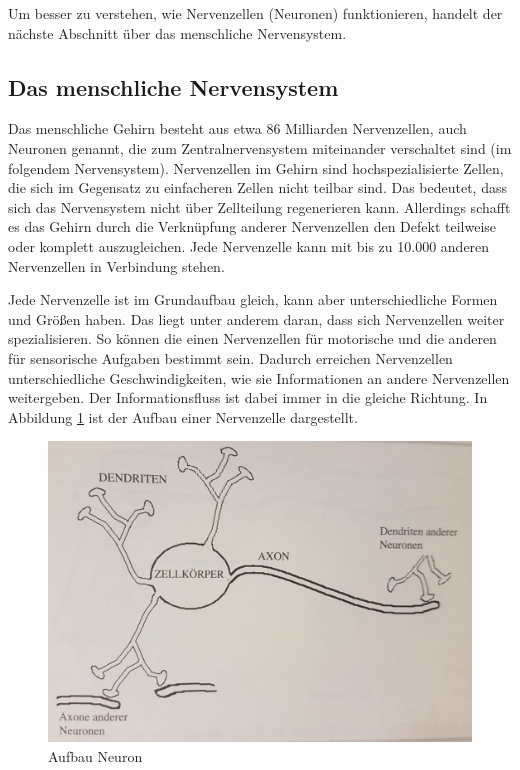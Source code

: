 Um besser zu verstehen, wie Nervenzellen (Neuronen) funktionieren, handelt der nächste Abschnitt über das menschliche Nervensystem.

\subsection{Das menschliche Nervensystem}
Das menschliche Gehirn besteht aus etwa 86 Milliarden Nervenzellen, auch Neuronen genannt, die zum Zentralnervensystem miteinander verschaltet sind (im folgendem Nervensystem).\cite{dasgehirn.info} Nervenzellen im Gehirn sind hochspezialisierte Zellen, die sich im Gegensatz zu einfacheren Zellen nicht teilbar sind. Das bedeutet, dass sich das Nervensystem nicht über Zellteilung regenerieren kann. Allerdings schafft es das Gehirn durch die Verknüpfung anderer Nervenzellen den Defekt teilweise oder komplett auszugleichen. Jede Nervenzelle kann mit bis zu 10.000 anderen Nervenzellen in Verbindung stehen.\cite{gehirnlernen.de} 

Jede Nervenzelle ist im Grundaufbau gleich, kann aber unterschiedliche Formen und Größen haben. Das liegt unter anderem daran, dass sich Nervenzellen weiter spezialisieren.\cite{gehirnlernen.de} So können die einen Nervenzellen für motorische und die anderen für sensorische Aufgaben bestimmt sein. Dadurch erreichen Nervenzellen unterschiedliche Geschwindigkeiten, wie sie Informationen an andere Nervenzellen weitergeben.\cite{dasgehirn.info} Der Informationsfluss ist dabei immer in die gleiche Richtung.\cite{gehirnlernen.de} In Abbildung \ref{fig:AufbauNeuron} ist der Aufbau einer Nervenzelle dargestellt.

\begin{figure}[hbt]
	\centering
	\includegraphics[width=0.9\linewidth]{./Bilder/Aufbau_Nervenzelle_Mazzetti}
	\caption{Aufbau Neuron \cite[S. 11]{Mazzetti1996}}
	\label{fig:AufbauNeuron}
\end{figure}


